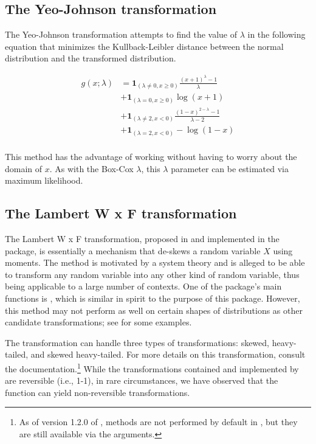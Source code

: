 \hypertarget{the-yeo-johnson-transformation}{%
\subsection{The Yeo-Johnson
transformation}\label{the-yeo-johnson-transformation}}

The Yeo-Johnson transformation \citep{yeojohnson} attempts to find the
value of \(\lambda\) in the following equation that minimizes the
Kullback-Leibler distance between the normal distribution and the
transformed distribution.

\[
\begin{aligned}
g(x;\lambda) &= 
\boldsymbol 1 _{(\lambda \neq 0, x \geq 0)} \frac{(x+1)^\lambda-1}{\lambda} \\
&+ \boldsymbol 1_{(\lambda = 0, x \geq 0)} \log (x+1) \\
&+ \boldsymbol 1_{(\lambda \neq 2, x < 0)} \frac{(1-x)^{2-\lambda}-1}{\lambda - 2} \\
&+ \boldsymbol 1_{(\lambda = 2, x < 0)} -\log (1-x) \\
\end{aligned}
\]

This method has the advantage of working without having to worry about
the domain of \(x\). As with the Box-Cox \(\lambda\), this \(\lambda\)
parameter can be estimated via maximum likelihood.

\hypertarget{the-lambert-w-x-f-transformation}{%
\subsection{The Lambert W x F
transformation}\label{the-lambert-w-x-f-transformation}}

The Lambert W x F transformation, proposed in \citet{goerg2011} and
implemented in the  package, is essentially a
mechanism that de-skews a random variable \(X\) using moments. The
method is motivated by a system theory and is alleged to be able to
transform any random variable into any other kind of random variable,
thus being applicable to a large number of contexts. One of the
package's main functions is , which is similar in
spirit to the purpose of this package. However, this method may not
perform as well on certain shapes of distributions as other candidate
transformations; see \citet{orq_paper} for some examples.

The  transformation can handle three types of
transformations: skewed, heavy-tailed, and skewed heavy-tailed. For more
details on this transformation, consult the 
documentation.\footnote{As of version 1.2.0 of ,  methods are not performed by default in , but they are still available via the  arguments.}
While the transformations contained and implemented by
 are reversible (i.e., 1-1), in rare circumstances,
we have observed that the  function can yield
non-reversible transformations.

